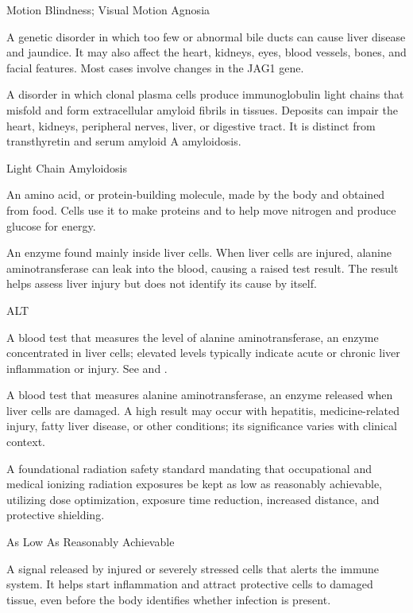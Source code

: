 \synonyms
Motion Blindness; Visual Motion Agnosia

 A genetic disorder in which too few or abnormal bile ducts can cause liver disease and jaundice. It may also affect the heart, kidneys, eyes, blood vessels, bones, and facial features. Most cases involve changes in the JAG1 gene.

 A disorder in which clonal plasma cells produce immunoglobulin light chains
that misfold and form extracellular amyloid fibrils in tissues. Deposits can impair the heart, kidneys,
peripheral nerves, liver, or digestive tract. It is distinct from transthyretin and serum amyloid A
amyloidosis.

\synonyms
Light Chain Amyloidosis

 An amino acid, or protein-building molecule, made by the body and obtained from food. Cells use it to make proteins and to help move nitrogen and produce glucose for energy.

 An enzyme found mainly inside liver cells. When liver cells are injured, alanine aminotransferase can leak into the blood, causing a raised test result. The result helps assess liver injury but does not identify its cause by itself.

\synonyms
ALT

 A blood test that measures the level of alanine aminotransferase, an enzyme concentrated in liver cells; elevated levels typically indicate acute or chronic liver inflammation or injury. See  and .

 A blood test that measures alanine aminotransferase, an enzyme released when liver cells are damaged. A high result may occur with hepatitis, medicine-related injury, fatty liver disease, or other conditions; its significance varies with clinical context.

 A foundational radiation safety standard mandating that occupational and medical ionizing radiation exposures be kept as low as reasonably achievable, utilizing dose optimization, exposure time reduction, increased distance, and protective shielding.

\synonyms
As Low As Reasonably Achievable

 A signal released by injured or severely stressed cells that alerts the immune system. It helps start inflammation and attract protective cells to damaged tissue, even before the body identifies whether infection is present.

